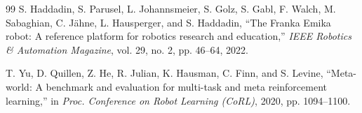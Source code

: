 \documentclass[letterpaper, 11 pt, journal, twoside]{IEEEtran}
\begin{document}
\begin{thebibliography}{99}
S. Haddadin, S. Parusel, L. Johannsmeier, S. Golz, S. Gabl, F. Walch, M. Sabaghian, C. J\"ahne, L. Hausperger, and S. Haddadin, ``The Franka Emika robot: A reference platform for robotics research and education,'' \emph{IEEE Robotics \& Automation Magazine}, vol. 29, no. 2, pp. 46--64, 2022.

T. Yu, D. Quillen, Z. He, R. Julian, K. Hausman, C. Finn, and S. Levine, ``Meta-world: A benchmark and evaluation for multi-task and meta reinforcement learning,'' in \emph{Proc. Conference on Robot Learning (CoRL)}, 2020, pp. 1094--1100.

\end{thebibliography}
\end{document}
